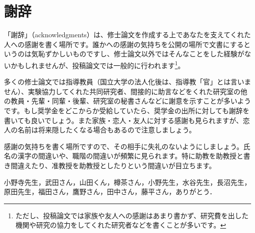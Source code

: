 \chapter*{謝辞}%
%

「謝辞」（acknowledgments）は、修士論文を作成する上であなたを支えてくれた人への感謝を書く場所です。誰かへの感謝の気持ちを公開の場所で文書にするというのは気恥ずかしいものですし、修士論文以外ではそんなことをした経験がないかもしれませんが、投稿論文では一般的に行われます\footnote{ただし、投稿論文では家族や友人への感謝はあまり書かず、研究費を出した機関や研究の協力をしてくれた研究者などを書くことが多いです。}。

多くの修士論文では指導教員（国立大学の法人化後は、指導教「官」とは言いません）、実験協力してくれた共同研究者、間接的に助言などをくれた研究室の他の教員・先輩・同輩・後輩、研究室の秘書さんなどに謝意を示すことが多いようです。もし奨学金をどこからか受給していたら、奨学金の出所に対しても謝辞を書いても良いでしょう。また家族・恋人・友人に対する感謝も見られますが、恋人の名前は将来隠したくなる場合もあるので注意しましょう。

感謝の気持ちを書く場所ですので、その相手に失礼のないようにしましょう。氏名の漢字の間違いや、職階の間違いが頻繁に見られます。特に助教を助教授と書き間違えたり、准教授を助教授としたりという間違いが目立ちます。


小野寺先生，武田さん，山田くん，樽茶さん，小野先生，水谷先生，長沼先生，原田先生，福田さん，鷹野さん，田中さん，藤平さん，ありがとう．

